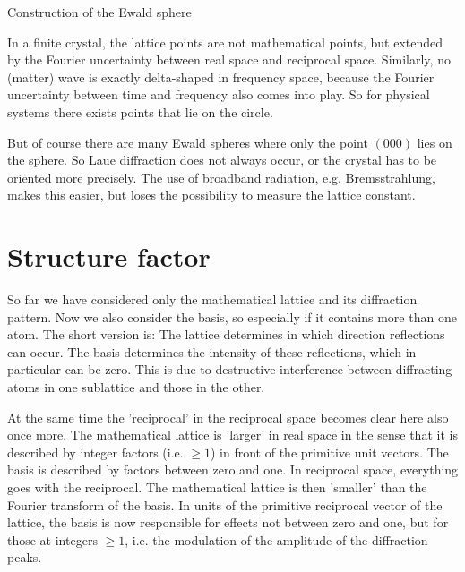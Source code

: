 \begin{marginfigure}

\caption{Construction of the Ewald sphere}
\end{marginfigure}


In a finite crystal, the lattice points are not mathematical points, but extended by the Fourier uncertainty between real space and reciprocal space. Similarly, no (matter) wave is exactly delta-shaped in frequency space, because the Fourier uncertainty between time and frequency also comes into play. So for physical systems there exists points that lie on the circle.

But of course there are many Ewald spheres where only the point $(000)$ lies on the sphere. So Laue diffraction does not always occur, or the crystal has to be oriented more precisely. The use of broadband radiation, e.g. Bremsstrahlung, makes this easier, but loses the possibility to measure the lattice constant.


\section{Structure factor}

So far we have considered only the mathematical lattice and its diffraction pattern. Now we also consider the basis, so especially if it contains more than one atom. The short version is: The lattice determines in which direction reflections can occur. The basis determines the intensity of these reflections, which in particular can be zero. This is due to destructive interference between diffracting atoms in one sublattice and those in the other.

At the same time the 'reciprocal' in the reciprocal space becomes clear here also once more. The mathematical lattice is 'larger' in real space in the sense that it is described by integer factors (i.e. $\ge 1$) in front of the primitive unit vectors. The basis is described by factors between zero and one. In reciprocal space, everything goes with the reciprocal. The mathematical lattice is then 'smaller' than the Fourier transform of the basis. In units of the primitive reciprocal vector of the lattice, the basis is now responsible for effects not between zero and one, but for those at integers $\ge 1$, i.e. the modulation of the amplitude of the diffraction peaks.

